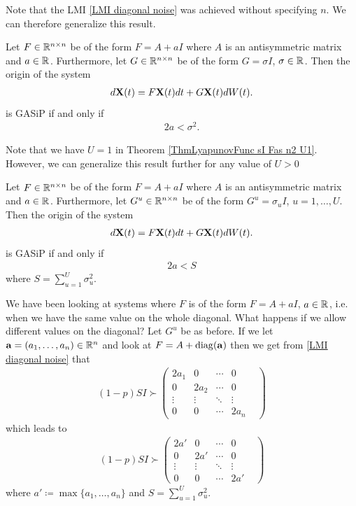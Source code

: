 \documentclass[a4paper,12pt,twoside,BCOR=10mm]{scrbook}
\begin{document}
Note that the LMI \eqref{LMI diagonal noise} was achieved without specifying $n$. We can therefore generalize this result.
\begin{theorem}\label{ThmLyapunovFunc sI Fas n2 U1}
Let $F\in\mathbb{R}^{n\times n}$ be of the form $F = A + aI$ where $A$ is an antisymmetric matrix and $a \in \mathbb{R}^{}$. Furthermore, let $G \in \mathbb{R}^{n \times n}$ be of the form $G = \sigma I$, $\sigma\in \mathbb{R}^{}$. Then the origin of the system
\begin{align*}
    d\mathbf{X}(t) = F\mathbf{X}(t)dt + G\mathbf{X}(t)dW(t).
\end{align*}
is GASiP if and only if
\begin{align*}
2a < \sigma^2.
\end{align*}
\end{theorem}

Note that we have $U = 1$ in Theorem \ref{ThmLyapunovFunc sI Fas n2 U1}. However, we can generalize this result further for any value of $U > 0$

\begin{theorem}
Let $F\in \mathbb{R}^{n\times n}$ be of the form $F = A + aI$ where $A$ is an antisymmetric matrix and $a \in \mathbb{R}^{}$. Furthermore, let $G^u \in \mathbb{R}^{n\times n}$ be of the form $G^u = \sigma_u I$, $u = 1,\ldots, U$. Then the origin of the system
\begin{align*}
    d\mathbf{X}(t) = F\mathbf{X}(t)dt + G\mathbf{X}(t)dW(t).
\end{align*}
is GASiP if and only if
\begin{align*}
    2a < S
\end{align*}
where $S = \sum\limits_{u = 1}^U \sigma_u^2$.
\end{theorem}

We have been looking at systems where $F$ is of the form $F = A + aI$, $a \in \mathbb{R}^{}$, i.e. when we have the same value on the whole diagonal. What happens if we allow different values on the diagonal? Let $G^u$ be as before. If we let $\mathbf{a} = (a_1, \ldots, a_n)\in \mathbb{R}^{n}$ and look at $F = A + \operatorname{diag}(\mathbf{a})$ then we get from \eqref{LMI diagonal noise} that
\begin{align*}
    (1 - p)SI \succ \begin{pmatrix}
    2a_1 & 0 & \cdots & 0\\
    0 & 2a_2 & \cdots & 0\\
    \vdots & \vdots & \ddots & \vdots\\
    0 & 0 & \cdots & 2a_n&
    \end{pmatrix}
\end{align*}
which leads to
\begin{align*}
    (1 - p)SI \succ \begin{pmatrix}
    2a' & 0 & \cdots & 0\\
    0 & 2a' & \cdots & 0\\
    \vdots & \vdots & \ddots & \vdots\\
    0 & 0 & \cdots & 2a'&
    \end{pmatrix}
\end{align*}
where $a' \coloneqq \max\{a_1, \ldots, a_n\}$ and $S = \sum\limits_{u = 1}^U \sigma_u^2$.
\end{document}
